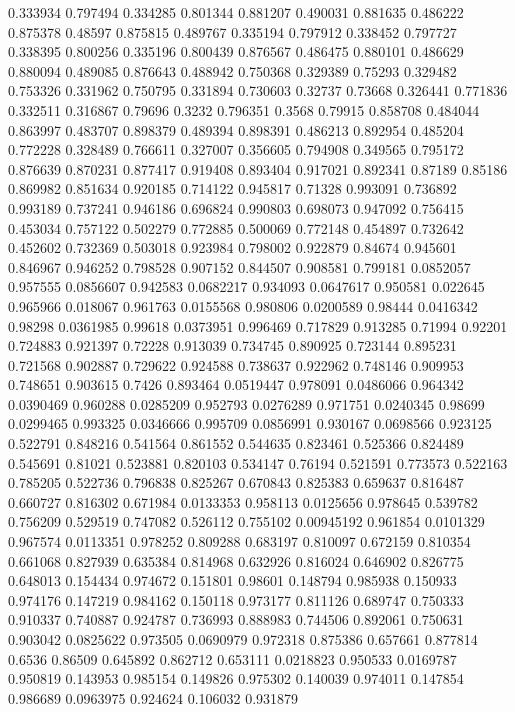 0.333934 0.797494
0.334285 0.801344
0.881207 0.490031
0.881635 0.486222
0.875378 0.48597
0.875815 0.489767
0.335194 0.797912
0.338452 0.797727
0.338395 0.800256
0.335196 0.800439
0.876567 0.486475
0.880101 0.486629
0.880094 0.489085
0.876643 0.488942
0.750368 0.329389
0.75293 0.329482
0.753326 0.331962
0.750795 0.331894
0.730603 0.32737
0.73668 0.326441
0.771836 0.332511
0.316867 0.79696
0.3232 0.796351
0.3568 0.79915
0.858708 0.484044
0.863997 0.483707
0.898379 0.489394
0.898391 0.486213
0.892954 0.485204
0.772228 0.328489
0.766611 0.327007
0.356605 0.794908
0.349565 0.795172
0.876639 0.870231
0.877417 0.919408
0.893404 0.917021
0.892341 0.87189
0.85186 0.869982
0.851634 0.920185
0.714122 0.945817
0.71328 0.993091
0.736892 0.993189
0.737241 0.946186
0.696824 0.990803
0.698073 0.947092
0.756415 0.453034
0.757122 0.502279
0.772885 0.500069
0.772148 0.454897
0.732642 0.452602
0.732369 0.503018
0.923984 0.798002
0.922879 0.84674
0.945601 0.846967
0.946252 0.798528
0.907152 0.844507
0.908581 0.799181
0.0852057 0.957555
0.0856607 0.942583
0.0682217 0.934093
0.0647617 0.950581
0.022645 0.965966
0.018067 0.961763
0.0155568 0.980806
0.0200589 0.98444
0.0416342 0.98298
0.0361985 0.99618
0.0373951 0.996469
0.717829 0.913285
0.71994 0.92201
0.724883 0.921397
0.72228 0.913039
0.734745 0.890925
0.723144 0.895231
0.721568 0.902887
0.729622 0.924588
0.738637 0.922962
0.748146 0.909953
0.748651 0.903615
0.7426 0.893464
0.0519447 0.978091
0.0486066 0.964342
0.0390469 0.960288
0.0285209 0.952793
0.0276289 0.971751
0.0240345 0.98699
0.0299465 0.993325
0.0346666 0.995709
0.0856991 0.930167
0.0698566 0.923125
0.522791 0.848216
0.541564 0.861552
0.544635 0.823461
0.525366 0.824489
0.545691 0.81021
0.523881 0.820103
0.534147 0.76194
0.521591 0.773573
0.522163 0.785205
0.522736 0.796838
0.825267 0.670843
0.825383 0.659637
0.816487 0.660727
0.816302 0.671984
0.0133353 0.958113
0.0125656 0.978645
0.539782 0.756209
0.529519 0.747082
0.526112 0.755102
0.00945192 0.961854
0.0101329 0.967574
0.0113351 0.978252
0.809288 0.683197
0.810097 0.672159
0.810354 0.661068
0.827939 0.635384
0.814968 0.632926
0.816024 0.646902
0.826775 0.648013
0.154434 0.974672
0.151801 0.98601
0.148794 0.985938
0.150933 0.974176
0.147219 0.984162
0.150118 0.973177
0.811126 0.689747
0.750333 0.910337
0.740887 0.924787
0.736993 0.888983
0.744506 0.892061
0.750631 0.903042
0.0825622 0.973505
0.0690979 0.972318
0.875386 0.657661
0.877814 0.6536
0.86509 0.645892
0.862712 0.653111
0.0218823 0.950533
0.0169787 0.950819
0.143953 0.985154
0.149826 0.975302
0.140039 0.974011
0.147854 0.986689
0.0963975 0.924624
0.106032 0.931879
